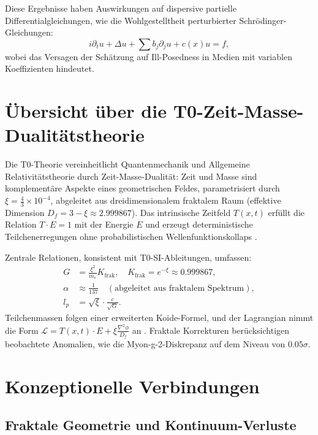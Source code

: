 	Diese Ergebnisse haben Auswirkungen auf dispersive partielle Differentialgleichungen, wie die Wohlgestelltheit perturbierter Schrödinger-Gleichungen:
	\begin{equation}
		i \partial_t u + \Delta u + \sum b_j \partial_j u + c(x) u = f,
	\end{equation}
	wobei das Versagen der Schätzung auf Ill-Posedness in Medien mit variablen Koeffizienten hindeutet.
	
	\section{Übersicht über die T0-Zeit-Masse-Dualitätstheorie}
	
	Die T0-Theorie vereinheitlicht Quantenmechanik und Allgemeine Relativitätstheorie durch Zeit-Masse-Dualität: Zeit und Masse sind komplementäre Aspekte eines geometrischen Feldes, parametrisiert durch $\xi = \frac{4}{3} \times 10^{-4}$, abgeleitet aus dreidimensionalem fraktalem Raum (effektive Dimension $D_f = 3 - \xi \approx 2.999867$). Das intrinsische Zeitfeld $T(x,t)$ erfüllt die Relation $T \cdot E = 1$ mit der Energie $E$ und erzeugt deterministische Teilchenerregungen ohne probabilistischen Wellenfunktionskollaps \cite{T0_tm_erweiterung}.
	
	Zentrale Relationen, konsistent mit T0-SI-Ableitungen, umfassen:
	\begin{align}
		G &= \frac{\xi^2}{m_e} K_\text{frak}, \quad K_\text{frak} = e^{-\xi} \approx 0.999867, \label{eq:G} \\
		\alpha &\approx \frac{1}{137} \quad (\text{abgeleitet aus fraktalem Spektrum}), \label{eq:alpha} \\
		l_p &= \sqrt{\xi} \cdot \frac{c}{\sqrt{G}}. \label{eq:lp}
	\end{align}
	Teilchenmassen folgen einer erweiterten Koide-Formel, und der Lagrangian nimmt die Form $\mathcal{L} = T(x,t) \cdot E + \xi \frac{\nabla^2 \phi}{D_f}$ an \cite{T0_g2_erweiterung}. Fraktale Korrekturen berücksichtigen beobachtete Anomalien, wie die Myon-g-2-Diskrepanz auf dem Niveau von $0.05\sigma$.
	
	\section{Konzeptionelle Verbindungen}
	
	\subsection{Fraktale Geometrie und Kontinuum-Verluste}
	
